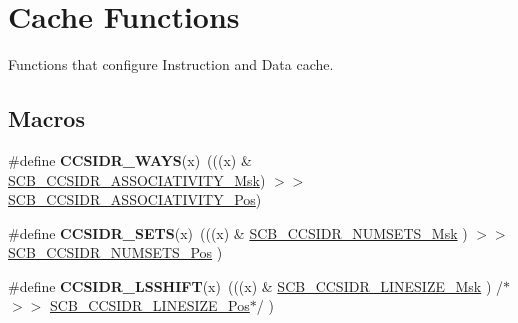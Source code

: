 \hypertarget{group___c_m_s_i_s___core___cache_functions}{}\section{Cache Functions}
\label{group___c_m_s_i_s___core___cache_functions}


Functions that configure Instruction and Data cache.  


\subsection*{Macros}
\begin{DoxyCompactItemize}
\item 
\#define {\bfseries C\+C\+S\+I\+D\+R\+\_\+\+W\+A\+YS}(x)~(((x) \& \hyperlink{group___c_m_s_i_s___s_c_b_gae093c4c635dad43845967512fa87173a}{S\+C\+B\+\_\+\+C\+C\+S\+I\+D\+R\+\_\+\+A\+S\+S\+O\+C\+I\+A\+T\+I\+V\+I\+T\+Y\+\_\+\+Msk}) $>$$>$ \hyperlink{group___c_m_s_i_s___s_c_b_gae67f2f83976b819fb3039fc35cfef0fb}{S\+C\+B\+\_\+\+C\+C\+S\+I\+D\+R\+\_\+\+A\+S\+S\+O\+C\+I\+A\+T\+I\+V\+I\+T\+Y\+\_\+\+Pos})\hypertarget{group___c_m_s_i_s___core___cache_functions_ga3d672529cd193537fe2a0141931c6ad9}{}\label{group___c_m_s_i_s___core___cache_functions_ga3d672529cd193537fe2a0141931c6ad9}

\item 
\#define {\bfseries C\+C\+S\+I\+D\+R\+\_\+\+S\+E\+TS}(x)~(((x) \& \hyperlink{group___c_m_s_i_s___s_c_b_ga47d1f01185d7a039334031008386c5a8}{S\+C\+B\+\_\+\+C\+C\+S\+I\+D\+R\+\_\+\+N\+U\+M\+S\+E\+T\+S\+\_\+\+Msk}      ) $>$$>$ \hyperlink{group___c_m_s_i_s___s_c_b_ga1028d2c238f74d2aa021f53ffbe8d7ab}{S\+C\+B\+\_\+\+C\+C\+S\+I\+D\+R\+\_\+\+N\+U\+M\+S\+E\+T\+S\+\_\+\+Pos}      )\hypertarget{group___c_m_s_i_s___core___cache_functions_gaf20feee7c52fee32b48ee0d2ceaaf932}{}\label{group___c_m_s_i_s___core___cache_functions_gaf20feee7c52fee32b48ee0d2ceaaf932}

\item 
\#define {\bfseries C\+C\+S\+I\+D\+R\+\_\+\+L\+S\+S\+H\+I\+FT}(x)~(((x) \& \hyperlink{group___c_m_s_i_s___s_c_b_ga07b3bdffe4c289b9c19c70cf698499da}{S\+C\+B\+\_\+\+C\+C\+S\+I\+D\+R\+\_\+\+L\+I\+N\+E\+S\+I\+Z\+E\+\_\+\+Msk}     ) /$\ast$$>$$>$ \hyperlink{group___c_m_s_i_s___s_c_b_ga750388e1509b36d35568a68a7a1e1ff7}{S\+C\+B\+\_\+\+C\+C\+S\+I\+D\+R\+\_\+\+L\+I\+N\+E\+S\+I\+Z\+E\+\_\+\+Pos}$\ast$/ )\hypertarget{group___c_m_s_i_s___core___cache_functions_ga60edd8f48c1382d93fc7daef51053681}{}\label{group___c_m_s_i_s___core___cache_functions_ga60edd8f48c1382d93fc7daef51053681}

\end{DoxyCompactItemize}
